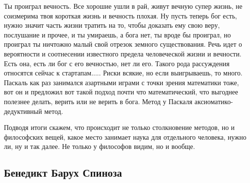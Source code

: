 \documentclass[a4paper, 12pt]{article}
\begin{document}
Ты проиграл вечность. Все хорошие ушли в рай, живут вечную супер жизнь, 
не соизмерима твоя короткая жизнь и вечность плохая. Ну пусть теперь бог 
есть, нужно значит часть жизни тратить на то, чтобы доказать ему свою 
веру, послушание и прочее, и ты умираешь, а бога нет, ты вроде бы 
проиграл, но проиграл ты ничтожно малый свой отрезок земного 
существования. Речь идет о вероятности и соотнесении известного предела 
человеческой жизни и вечности. Есть она, есть ли бог с его вечностью, 
нет ли его. Такого рода рассуждения относятся сейчас к стартапам..... 
Риски всякие, но если выигрываешь, то много. Паскаль как раз занимался 
азартными играми с точки зрения математики тоже, вот он и предложил вот 
такой подход почти что математический, что выгоднее полезнее делать, 
верить или не верить в бога. Метод у Паскаля аксиоматико-дедуктивный 
метод.

Подводя итоги скажем, что происходит не только столкновение методов, но 
и философских вещей, какое место занимает наука для отдельного человека, 
нужно ли, ну и так далее. Не только у философов видим, но и вообще.

\subsection{Бенедикт Барух Спиноза}
\end{document}
